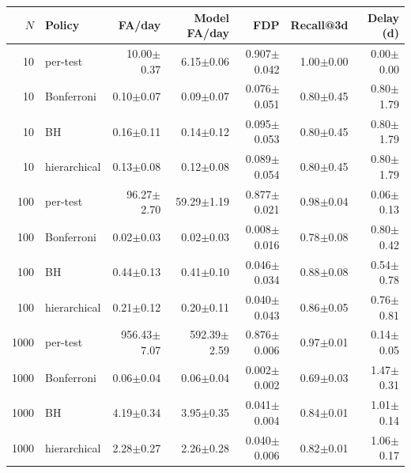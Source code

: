 \begin{tabular}{rlrrrrr}
\toprule
$N$ & Policy & FA/day & Model FA/day & FDP & Recall@3d & Delay (d) \\
\midrule
10 & per-test & 10.00$\pm$0.37 & 6.15$\pm$0.06 & 0.907$\pm$0.042 & 1.00$\pm$0.00 & 0.00$\pm$0.00 \\
10 & Bonferroni & 0.10$\pm$0.07 & 0.09$\pm$0.07 & 0.076$\pm$0.051 & 0.80$\pm$0.45 & 0.80$\pm$1.79 \\
10 & BH & 0.16$\pm$0.11 & 0.14$\pm$0.12 & 0.095$\pm$0.053 & 0.80$\pm$0.45 & 0.80$\pm$1.79 \\
10 & hierarchical & 0.13$\pm$0.08 & 0.12$\pm$0.08 & 0.089$\pm$0.054 & 0.80$\pm$0.45 & 0.80$\pm$1.79 \\
\midrule
100 & per-test & 96.27$\pm$2.70 & 59.29$\pm$1.19 & 0.877$\pm$0.021 & 0.98$\pm$0.04 & 0.06$\pm$0.13 \\
100 & Bonferroni & 0.02$\pm$0.03 & 0.02$\pm$0.03 & 0.008$\pm$0.016 & 0.78$\pm$0.08 & 0.80$\pm$0.42 \\
100 & BH & 0.44$\pm$0.13 & 0.41$\pm$0.10 & 0.046$\pm$0.034 & 0.88$\pm$0.08 & 0.54$\pm$0.78 \\
100 & hierarchical & 0.21$\pm$0.12 & 0.20$\pm$0.11 & 0.040$\pm$0.043 & 0.86$\pm$0.05 & 0.76$\pm$0.81 \\
\midrule
1000 & per-test & 956.43$\pm$7.07 & 592.39$\pm$2.59 & 0.876$\pm$0.006 & 0.97$\pm$0.01 & 0.14$\pm$0.05 \\
1000 & Bonferroni & 0.06$\pm$0.04 & 0.06$\pm$0.04 & 0.002$\pm$0.002 & 0.69$\pm$0.03 & 1.47$\pm$0.31 \\
1000 & BH & 4.19$\pm$0.34 & 3.95$\pm$0.35 & 0.041$\pm$0.004 & 0.84$\pm$0.01 & 1.01$\pm$0.14 \\
1000 & hierarchical & 2.28$\pm$0.27 & 2.26$\pm$0.28 & 0.040$\pm$0.006 & 0.82$\pm$0.01 & 1.06$\pm$0.17 \\
\bottomrule
\end{tabular}
